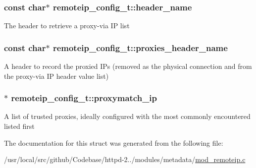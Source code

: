 \subsubsection[{\texorpdfstring{header\+\_\+name}{header_name}}]{\setlength{\rightskip}{0pt plus 5cm}const char$\ast$ remoteip\+\_\+config\+\_\+t\+::header\+\_\+name}\hypertarget{structremoteip__config__t_a36e75762ecbda5fb7e8f2eb2ac237594}{}\label{structremoteip__config__t_a36e75762ecbda5fb7e8f2eb2ac237594}
The header to retrieve a proxy-\/via IP list 
\subsubsection[{\texorpdfstring{proxies\+\_\+header\+\_\+name}{proxies_header_name}}]{\setlength{\rightskip}{0pt plus 5cm}const char$\ast$ remoteip\+\_\+config\+\_\+t\+::proxies\+\_\+header\+\_\+name}\hypertarget{structremoteip__config__t_a82e836f2a33b91ac6d1c0ddb607b3ba6}{}\label{structremoteip__config__t_a82e836f2a33b91ac6d1c0ddb607b3ba6}
A header to record the proxied IP\textquotesingle{}s (removed as the physical connection and from the proxy-\/via IP header value list) 
\subsubsection[{\texorpdfstring{proxymatch\+\_\+ip}{proxymatch_ip}}]{$\ast$ remoteip\+\_\+config\+\_\+t\+::proxymatch\+\_\+ip}\hypertarget{structremoteip__config__t_a5c081785f4a98e505c4ac785ac939143}{}\label{structremoteip__config__t_a5c081785f4a98e505c4ac785ac939143}
A list of trusted proxies, ideally configured with the most commonly encountered listed first 

The documentation for this struct was generated from the following file\+:\begin{DoxyCompactItemize}
\item 
/usr/local/src/github/\+Codebase/httpd-\/2../modules/metadata/\hyperlink{mod__remoteip_8c}{mod\+\_\+remoteip.\+c}\end{DoxyCompactItemize}
